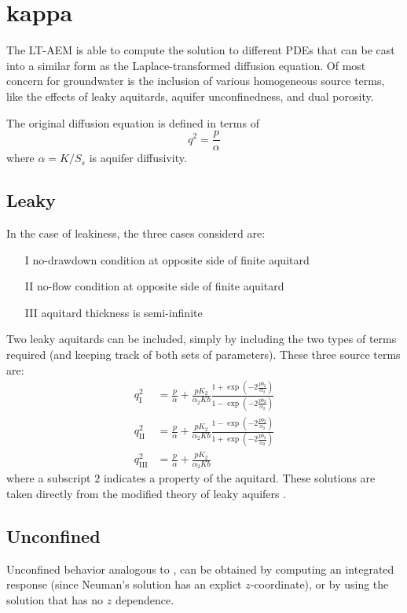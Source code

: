 \documentclass{article}
\begin{document}
\section{kappa}
\label{sec:kappa}

The LT-AEM is able to compute the solution to different PDEs that can
be cast into a similar form as the Laplace-transformed diffusion
equation.  Of most concern for groundwater is the inclusion of various
homogeneous source terms, like the effects of leaky aquitards, aquifer
unconfinedness, and dual porosity.

The original diffusion equation is defined in terms of 
\begin{equation}
  \label{eq:1}
  q^2 = \frac{p}{\alpha}
\end{equation}
where $\alpha=K/S_s$ is aquifer diffusivity.  

\subsection{Leaky}
In the case of leakiness, the three cases considerd are:
\begin{enumerate}
\item[I] no-drawdown condition at opposite side of finite aquitard
\item[II] no-flow condition at opposite side of finite aquitard
\item[III] aquitard thickness is semi-infinite
\end{enumerate}
Two leaky aquitards can be included, simply by including the two types
of terms required (and keeping track of both sets of parameters).
These three source terms are:
\begin{align}
  q_{\mathrm{I}}^2 &= \frac{p}{\alpha} + \frac{p K_2}{\alpha_2 Kb} \frac{1 + \exp\left(-2 \frac{p b_2}{\alpha_2}\right)}{1 - \exp\left(-2 \frac{p b_2}{\alpha_2}\right)} \\
  q_{\mathrm{II}}^2 &= \frac{p}{\alpha} + \frac{p K_2}{\alpha_2 Kb} \frac{1 - \exp\left(-2 \frac{p b_2}{\alpha_2}\right)}{1 + \exp\left(-2 \frac{p b_2}{\alpha_2}\right)} \\
  q_{\mathrm{III}}^2 &= \frac{p}{\alpha} + \frac{p K_2}{\alpha_2 Kb} 
\end{align}
where a subscript $2$ indicates a property of the aquitard.  These
solutions are taken directly from the modified theory of leaky
aquifers \cite{hantush1960modification}.

\subsection{Unconfined}
Unconfined behavior analogous to \cite{neuman1972theory}, can be
obtained by computing an integrated response (since Neuman's solution
has an explict $z$-coordinate), or by using the
\cite{boulton1954drawdown} solution that has no $z$ dependence.
\end{document}
